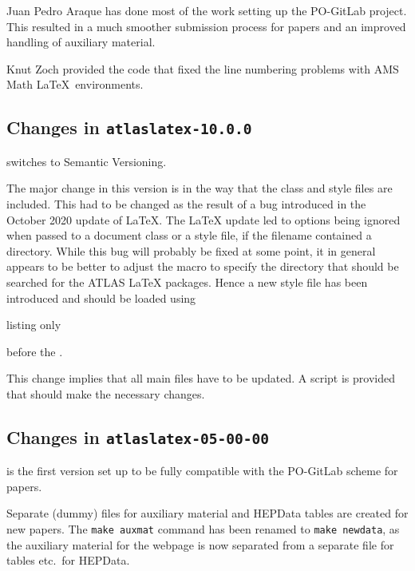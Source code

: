 Juan Pedro Araque has done most of the work setting up the PO-GitLab project.
This resulted in a much smoother submission process for papers and
an improved handling of auxiliary material.

Knut Zoch provided the code that fixed the line numbering problems with AMS Math \LaTeX\ environments.


\subsection{Changes in \texttt{atlaslatex-10.0.0}}
\label{sec:atlaslatex10}

 switches to Semantic Versioning.

The major change in this version is in the way that the class and style files are included.
This had to be changed as the result of a bug introduced in the October 2020 update of \LaTeX.
The \LaTeX{} update led to options being ignored when passed to a document class or a style file,
if the filename contained a directory.
While this bug will probably be fixed at some point,
it in general appears to be better to adjust the macro 
to specify the directory that should be searched for the ATLAS \LaTeX{} packages.
Hence a new style file  has been introduced and should be loaded using
\begin{tcblisting}{listing only}
\RequirePackage{latex/atlaslatexpath}
\end{tcblisting}
before the .

This change implies that all main files have to be updated.
A script  is provided that should make the necessary changes.


\subsection{Changes in \texttt{atlaslatex-05-00-00}}
\label{sec:atlaslatex5}

 is the first version set up
to be fully compatible with the PO-GitLab scheme for papers.

Separate (dummy) files for auxiliary material and HEPData tables are created for new papers.
The \verb|make auxmat| command has been renamed to \verb|make newdata|,
as the auxiliary material for the webpage is now separated
from a separate file for tables etc.\ for HEPData.


